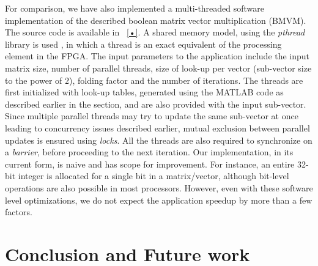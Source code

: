 \documentclass[conference, 9pt]{IEEEtran}
\begin{document}
For comparison, we have also implemented a multi-threaded software implementation of the described boolean matrix vector multiplication (BMVM). The source code is available in ~\ref{•}. A shared memory model, using the \emph{pthread} library is used , in which a thread is an exact equivalent of the processing element in the FPGA. The input parameters to the application include the input matrix size, number of parallel threads, size of look-up per vector (sub-vector size to the power of $2$), folding factor and the number of iterations. The threads are first initialized with look-up tables, generated using the MATLAB code as described earlier in the section, and are also provided with the input sub-vector. Since multiple parallel threads may try to update the same sub-vector at once leading to concurrency issues described earlier, mutual exclusion between parallel updates is ensured using \emph{locks}. All the threads are also required to synchronize on a \emph{barrier}, before proceeding to the next 
iteration. Our implementation, in its current form, is naive and has scope for improvement. For instance, an entire 32-bit integer is allocated for a single bit in a matrix/vector, although bit-level operations are also possible in most processors. However, even with these software level optimizations, we do not expect the application speedup by more than a few factors.


\section{Conclusion and Future work}



\end{document}
